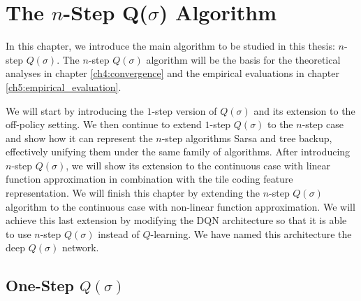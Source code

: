 \providecommand{\main}{..}


\chapter{The $n$-Step Q($\sigma$) Algorithm}
\label{ch3:qsigma}

In this chapter, we introduce the main algorithm to be studied in this thesis: $n$-step $Q(\sigma)$.
The $n$-step $Q(\sigma)$ algorithm will be the basis for the theoretical analyses in chapter \ref{ch4:convergence} and the empirical evaluations in chapter \ref{ch5:empirical_evaluation}.

We will start by introducing the $1$-step version of $Q(\sigma)$ and its extension to the off-policy setting.
We then continue to extend $1$-step $Q(\sigma)$ to the $n$-step case and show how it can represent the $n$-step algorithms Sarsa and tree backup, effectively unifying them under the same family of algorithms.
After introducing $n$-step $Q(\sigma)$, we will show its extension to the continuous case with linear function approximation in combination with the tile coding feature representation.
We will finish this chapter by extending the $n$-step $Q(\sigma)$ algorithm to the continuous case with non-linear function approximation.
We will achieve this last extension by modifying the DQN architecture \parencite{mnih2015humanlevel} so that it is able to use $n$-step $Q(\sigma)$ instead of $Q$-learning.
We have named this architecture the deep $Q(\sigma)$ network.

\section{One-Step $Q(\sigma)$}

